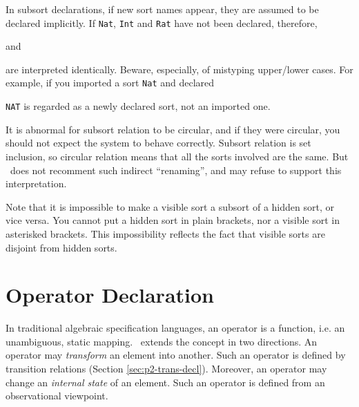 \documentclass[a4paper]{memoir}
\begin{document}
\begin{warning}
  In subsort declarations, if new sort names appear, they are
  assumed to be declared implicitly. If \texttt{Nat}, \texttt{Int} and
  \texttt{Rat} have not been declared, therefore,
  \begin{vvtm}
  \begin{ccode}
  \end{ccode}
  \end{vvtm}
  and
  \begin{vvtm}
  \begin{ccode}
  \end{ccode}
  \end{vvtm}
  are interpreted identically. Beware, especially, of mistyping
  upper/lower cases. For example, if you imported a sort
  \verb|Nat| and declared
  \begin{vvtm}
  \begin{ccode}
  \end{ccode}
  \end{vvtm}
  \verb|NAT| is regarded as a newly declared sort, not an imported
  one.
\end{warning}

It is abnormal for subsort relation to be circular, and if they were
circular, you should not expect the system to behave correctly.
Subsort relation is set inclusion, so circular relation
means that all the sorts involved are the same. But \cafeobj~does not
recomment such indirect ``renaming'', and may refuse to
support this interpretation.


Note that it is impossible to make a visible sort a subsort of
a hidden sort, or vice versa. You cannot put a hidden sort in
plain brackets, nor a visible sort in asterisked brackets.
This impossibility reflects the fact
that visible sorts are disjoint from hidden sorts.

\section{Operator Declaration}\label{sec:p2-operator}

In traditional algebraic specification languages, an operator
is a function, i.e. an unambiguous, static mapping.
\cafeobj~extends the concept in two directions.
An operator may {\em transform} an element into another.
Such an operator is defined by transition relations
(Section \ref{sec:p2-trans-decl}). Moreover, an operator
may change an {\em internal state} of an element. Such an
operator is defined from an observational viewpoint.
\end{document}
